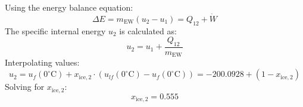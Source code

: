 Using the energy balance equation:  
\[
\Delta E = m_{\text{EW}} (u_2 - u_1) = Q_{12} + \dot{W}  
\]  
The specific internal energy \( u_2 \) is calculated as:  
\[
u_2 = u_1 + \frac{Q_{12}}{m_{\text{EW}}}  
\]  
Interpolating values:  
\[
u_2 = u_f(0^\circ\text{C}) + x_{\text{ice},2} \cdot (u_{lf}(0^\circ\text{C}) - u_f(0^\circ\text{C})) = -200.0928 + (1 - x_{\text{ice},2})  
\]  
Solving for \( x_{\text{ice},2} \):  
\[
x_{\text{ice},2} = 0.555  
\]